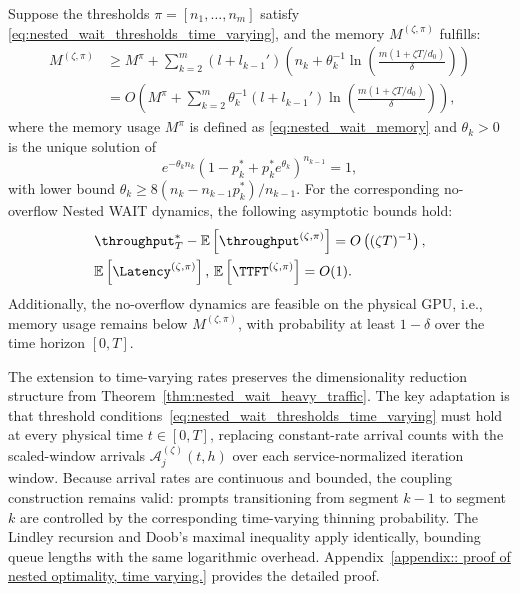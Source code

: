 \begin{theorem}
\label{thm:nested_wait_heavy_traffic_time_varying}
Suppose the thresholds $\pi = [n_1, \dots, n_m]$ satisfy \eqref{eq:nested_wait_thresholds_time_varying}, and the memory $M^{(\zeta,\pi)}$ fulfills:
\[
\begin{aligned}
M^{(\zeta,\pi)}
&\geq M^{\pi} + \sum_{k=2}^m (l + l_{k-1}') \left(n_k + \theta_k^{-1} \ln\!\left( \tfrac{m(1+\zeta T/d_0)}{\delta} \right)\right) \\
    &= O\!\left( M^\pi + \sum_{k=2}^m \theta_k^{-1}  (l + l_{k-1}') \ln\!\left( \tfrac{m(1+\zeta T/d_0)}{\delta} \right) \right),
\end{aligned}
\]
where the memory usage $M^\pi$ is defined as \eqref{eq:nested_wait_memory} and \(\theta_k>0\) is the unique solution of
\[
    e^{-\theta_k n_k}(1-p_k^*+p_k^*e^{\theta_k})^{n_{k-1}}=1,
\]
with lower bound \(\theta_k\ge 8(n_k-n_{k-1}p_k^*)/n_{k-1}\).
For the corresponding no-overflow Nested WAIT dynamics, the following asymptotic bounds hold:
$$
    \begin{aligned}
        &\throughput_T^* - \mathbb{E}\left[ \throughput^{(\zeta, \pi)} \right]
   = O\left( (\zeta T)^{-1} \right), \\
&\mathbb{E}\left[ \Latency^{(\zeta, \pi)} \right], \,\mathbb{E}\left[ \TTFT^{(\zeta, \pi)} \right] = O(1).
    \end{aligned}
$$
Additionally, the no-overflow dynamics are feasible on the physical GPU, i.e., memory usage remains below $M^{(\zeta,\pi)}$, with probability at least $1 - \delta$ over the time horizon $[0,T].$
\end{theorem}

The extension to time-varying rates preserves the dimensionality reduction structure from Theorem~\ref{thm:nested_wait_heavy_traffic}. The key adaptation is that threshold conditions~\eqref{eq:nested_wait_thresholds_time_varying} must hold at every physical time \(t \in [0,T]\), replacing constant-rate arrival counts with the scaled-window arrivals \(\mathcal A_j^{(\zeta)}(t,h)\) over each service-normalized iteration window. Because arrival rates are continuous and bounded, the coupling construction remains valid: prompts transitioning from segment \(k-1\) to segment \(k\) are controlled by the corresponding time-varying thinning probability. The Lindley recursion and Doob's maximal inequality apply identically, bounding queue lengths with the same logarithmic overhead. Appendix~\ref{appendix:: proof of nested optimality, time varying.} provides the detailed proof.

